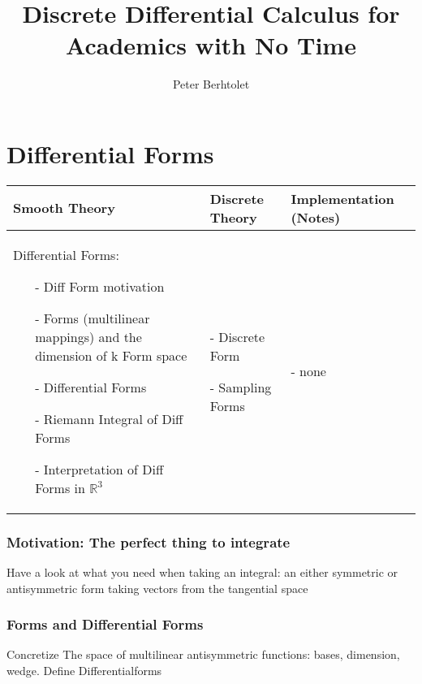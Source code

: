 \documentclass[draft]{scrbook}
\title{Discrete Differential Calculus for Academics with No Time}
\author{Peter Berhtolet}
\newenvironment{packed_enum}{
\begin{enumerate}
  \setlength{\itemsep}{1pt}
  \setlength{\parskip}{0pt}
  \setlength{\parsep}{0pt}
}{\end{enumerate}}
\begin{document}
	\maketitle
	\tableofcontents
	
	

	



\newpage
\chapter{Differential Forms}
	\begin{longtable}{|p{4.5cm}|p{4.5cm}|p{4.5cm}|}
		\hline
		Smooth Theory& Discrete Theory& Implementation (Notes)\\
		\hline
			Differential Forms: \begin{itemize}
			  \setlength{\itemsep}{1pt}
			  \setlength{\parskip}{0pt}
				\setlength{\parsep}{0pt}
				\item[-]Diff Form motivation
				\item[-]Forms (multilinear mappings) and the dimension of k Form space 
				\item[-]Differential Forms 
				\item[-]Riemann Integral of Diff Forms 
				\item[-]Interpretation of Diff Forms in $\mathbb R^3$ 
			\end{itemize}
			&
			\begin{packed_enum}
				\item[-] Discrete Form
				\item[-] Sampling Forms
			\end{packed_enum}
			 & - none
			 \\		
		\hline
	\end{longtable}
	\subsection{Motivation: The perfect thing to integrate}
		Have a look at what you need when taking an integral: an either symmetric or antisymmetric form taking
		vectors from the tangential space
	\subsection{Forms and Differential Forms}
		Concretize The space of multilinear antisymmetric functions: bases, dimension, wedge. Define Differentialforms
\end{document}
